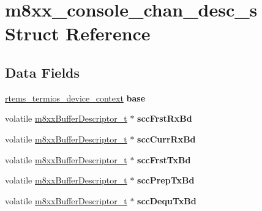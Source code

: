 \hypertarget{structm8xx__console__chan__desc__s}{}\section{m8xx\+\_\+console\+\_\+chan\+\_\+desc\+\_\+s Struct Reference}
\label{structm8xx__console__chan__desc__s}
\subsection*{Data Fields}
\begin{DoxyCompactItemize}
\item 
\mbox{\label{structm8xx__console__chan__desc__s_a38b7527ae653b349ff53be21dd8a1e49}} 
\mbox{\hyperlink{structrtems__termios__device__context}{rtems\+\_\+termios\+\_\+device\+\_\+context}} {\bfseries base}
\item 
\mbox{\label{structm8xx__console__chan__desc__s_a7a3ccdaacedd011765d8824e639c0de3}} 
volatile \mbox{\hyperlink{structm8xxBufferDescriptor__}{m8xx\+Buffer\+Descriptor\+\_\+t}} $\ast$ {\bfseries scc\+Frst\+Rx\+Bd}
\item 
\mbox{\label{structm8xx__console__chan__desc__s_aaa622ebd3e6c6a3199692ae04162ea83}} 
volatile \mbox{\hyperlink{structm8xxBufferDescriptor__}{m8xx\+Buffer\+Descriptor\+\_\+t}} $\ast$ {\bfseries scc\+Curr\+Rx\+Bd}
\item 
\mbox{\label{structm8xx__console__chan__desc__s_acdf86da4b2f7ef060c308c530897ac84}} 
volatile \mbox{\hyperlink{structm8xxBufferDescriptor__}{m8xx\+Buffer\+Descriptor\+\_\+t}} $\ast$ {\bfseries scc\+Frst\+Tx\+Bd}
\item 
\mbox{\label{structm8xx__console__chan__desc__s_aad7dfe4da6f94014fc2dcd057ebf08f0}} 
volatile \mbox{\hyperlink{structm8xxBufferDescriptor__}{m8xx\+Buffer\+Descriptor\+\_\+t}} $\ast$ {\bfseries scc\+Prep\+Tx\+Bd}
\item 
\mbox{\label{structm8xx__console__chan__desc__s_a8b40a61f4d380bde8c6df9a8b8378145}} 
volatile \mbox{\hyperlink{structm8xxBufferDescriptor__}{m8xx\+Buffer\+Descriptor\+\_\+t}} $\ast$ {\bfseries scc\+Dequ\+Tx\+Bd}

\end{DoxyCompactItemize}
